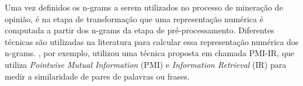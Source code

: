 \documentclass[template.tex]{subfiles}
\begin{document}
%


%
%
%
%
%
%
%
%

Uma vez definidos os n-grams a serem utilizados no processo de mineração de opinião, é na etapa de transformação que uma representação numérica é computada a partir dos n-grams da etapa de pré-processamento. Diferentes técnicas são utilizadas na literatura para calcular essa representação numérica dos n-grams. , por exemplo, utilizou uma técnica proposta em  chamada PMI-IR, que utiliza \textit{Pointwise Mutual Information} (PMI) e \textit{Information Retrieval} (IR) para medir a similaridade de pares de palavras ou frases. 
\end{document}
